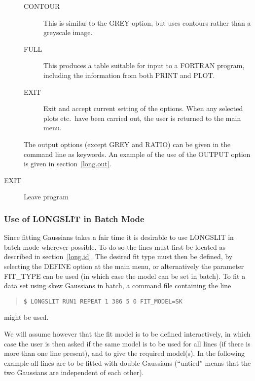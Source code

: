\begin{description}
\begin{description}
\item[CONTOUR] This is similar to the GREY option, but uses contours
rather than a greyscale image.
\item[FULL] This produces a table suitable for input to a FORTRAN
program, including the information from both PRINT and PLOT.
\item[EXIT] Exit and accept current setting of the options.
When any selected plots etc.\ have been carried out, the user is
returned to the main menu.
\end{description}
The output options (except GREY and RATIO) can be given in the command
line as keywords.
An example of the use of the OUTPUT option is given in
section~\ref{long.out}.
\item[EXIT] Leave program
\end{description}

\subsubsection{Use of LONGSLIT in Batch Mode}

Since fitting Gaussians takes a fair time it is desirable to use
LONGSLIT in batch mode wherever possible.
To do so the lines must first be located as described in
section~\ref{long.id}.
The desired fit type must then be defined, by selecting the DEFINE
option at the main menu, or alternatively the parameter FIT\_TYPE can be
used (in which case the model can be set in batch).
To fit a data set using skew Gaussians in batch, a command file
containing the line
\begin{quote}\begin{verbatim}
$ LONGSLIT RUN1 REPEAT 1 386 5 0 FIT_MODEL=SK
\end{verbatim}\end{quote}
might be used.

We will assume however that the fit model is to be defined
interactively, in which case the user is then asked if the same
model is to be used for all lines (if there is more than one line
present), and to give the required model(s).
In the following example all lines are to be fitted with double
Gaussians (``untied'' means that the two Gaussians are independent of
each other).

